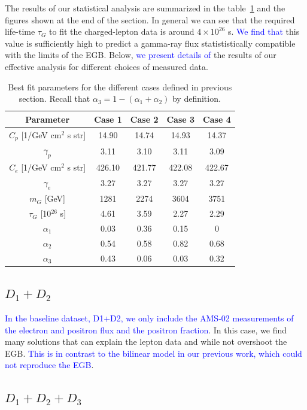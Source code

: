 \documentclass[a4paper,11pt]{article}
\newcommand*{\blue}{\textcolor{blue}}
\begin{document}
The results of our statistical analysis are summarized in the table~\ref{table:best-fit-summary} and the figures shown at the end of the section. In general we can see that the required life-time $\tau_G$ to fit the charged-lepton data is around $4\times 10^{26}$ s. \blue{We find that} this value is sufficiently high to predict a gamma-ray flux statististically compatible with the limits of the EGB. Below, \blue{we present details of} the results of our effective analysis for different choices of measured data.  

\begin{table}
\centering{}%
\begin{tabular}{|c|c|c|c|c|}
\hline 
 Parameter & Case 1 & Case 2 & Case 3 & Case 4 \tabularnewline
\hline 
\hline 
$C_p$ [1/GeV cm$^2$ s str] & 14.90 & 14.74 & 14.93 & 14.37 \tabularnewline
\hline 
$\gamma_p$ & 3.11 & 3.10 & 3.11 & 3.09  \tabularnewline
\hline 
$C_e$ [1/GeV cm$^2$ s str] & 426.10 & 421.77 & 422.08 & 422.67 \tabularnewline
\hline 
$\gamma_e$ & 3.27 & 3.27 & 3.27 & 3.27 \tabularnewline
\hline 
$m_G$ [GeV] & 1281 & 2274 & 3604 & 3751 \tabularnewline
\hline 
$\tau_G$ [10$^{26}$ s] & 4.61 & 3.59 & 2.27 & 2.29  \tabularnewline
\hline 
$\alpha_1$  & 0.03 &  0.36 & 0.15 &  0 \tabularnewline
\hline 
$\alpha_2$  & 0.54 &  0.58 & 0.82 & 0.68 \tabularnewline
\hline
\hline
$\alpha_3$  & 0.43 &  0.06 & 0.03 & 0.32 \tabularnewline
\hline 
\end{tabular}
\caption{Best fit parameters for the different cases defined in previous section. Recall that $\alpha_3= 1-(\alpha_1+\alpha_2)$ by definition.}
\label{table:best-fit-summary}
\end{table}

\subsection{$D_1 + D_2$}

\blue{In the baseline dataset, D1+D2, we only include the AMS-02 measurements of the electron and positron flux and the positron fraction}. In this case, we find many solutions that can explain the lepton data and while not overshoot the EGB. \blue{This is in contrast to the bilinear model in our previous work, which could not reproduce the EGB}. 


\subsection{$D_1 + D_2 + D_3$}
\end{document}
